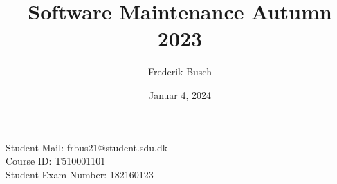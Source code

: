 \documentclass{article}
\title{%
    \bf{Software Maintenance Autumn 2023} \\
    
}
\author{Frederik Busch}
\date{Januar 4, 2024}
\begin{document}
\maketitle
\vspace{\fill}
\begin{center}
    \bf{%

        Student Mail: frbus21@student.sdu.dk\\
        Course ID: T510001101 \\
        Student Exam Number: 182160123}
\end{center}
\newpage
\setcounter{tocdepth}{2}
\tableofcontents
\newpage












\end{document}

